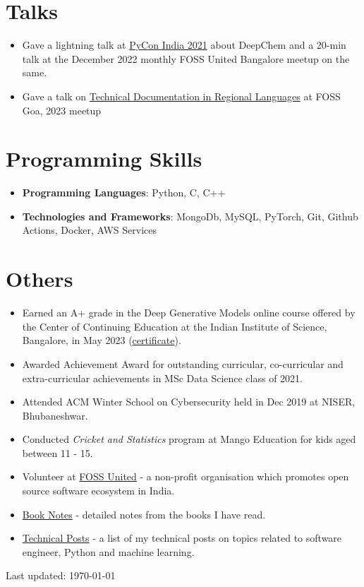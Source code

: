 \documentclass[letterpaper,11pt]{article}
\newcommand{\resumeItemSimple}[1]{
  \item\small{
    {#1 \vspace{-2pt}}
  }
}
\newcommand{\resumeSubItemSimple}[1]{\resumeItemSimple{#1}\vspace{-4pt}}
\newcommand{\resumeSubHeadingListStart}{\begin{itemize}[leftmargin=*]}
\newcommand{\resumeSubHeadingListEnd}{\end{itemize}}
\begin{document}
\section{Talks}
  \resumeSubHeadingListStart
    \resumeSubItemSimple {Gave a lightning talk at \href{https://www.youtube.com/watch?v=JEFrzjpf6d0}{PyCon India 2021} about DeepChem and a 20-min talk at the December 2022 monthly FOSS United Bangalore meetup on the same.}
    \resumeSubItemSimple {Gave a talk on \href{https://indiafoss.net/Goa/2023/talk/9faa6c6254}{Technical Documentation in Regional Languages} at FOSS Goa, 2023 meetup}
  \resumeSubHeadingListEnd

\section{Programming Skills}
  \resumeSubHeadingListStart
    \resumeSubItemSimple{\textbf{Programming Languages}{: Python, C, C++}}
    \resumeSubItemSimple{\textbf{Technologies and Frameworks}{: MongoDb, MySQL, PyTorch, Git, Github Actions, Docker, AWS Services}}
  \resumeSubHeadingListEnd

\section{Others}
  \resumeSubHeadingListStart
    \resumeSubItemSimple {Earned an A+ grade in the Deep Generative Models online course offered by the Center of Continuing Education at the Indian Institute of Science, Bangalore, in May 2023 (\href{https://www.arunppsg.in/assets/files/iisc_course_certificate.pdf}{certificate}).}
    \resumeSubItemSimple {Awarded Achievement Award for outstanding curricular, co-curricular and extra-curricular achievements in MSc Data Science class of 2021.}
    \resumeSubItemSimple {Attended ACM Winter School on Cybersecurity held in Dec 2019 at NISER, Bhubaneshwar.}
    \resumeSubItemSimple {Conducted \textit{Cricket and Statistics} program at Mango Education for kids aged between 11 - 15.}
    \resumeSubItemSimple {Volunteer at \href{https://fossunited.org/}{FOSS United} - a non-profit organisation which promotes open source software ecosystem in India.}
    \resumeSubItemSimple {\href{https://www.arunppsg.in/book-notes/}{Book Notes} - detailed notes from the books I have read.}
    \resumeSubItemSimple {\href{https://www.arunppsg.in/posts/}{Technical Posts} - a list of my technical posts on topics related to software engineer, Python and machine learning.}
  \resumeSubHeadingListEnd
%

\begin{footnotesize}
  Last updated: \today
\end{footnotesize}
\end{document}
